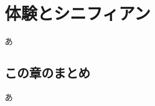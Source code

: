 \section{体験とシニフィアン}\label{ux7b2cux56dbux7ae0ux4f53ux9a13ux3068ux30b7ux30cbux30d5ux30a3ux30a2ux30f3}

あ

\subsection{この章のまとめ}\label{ux3053ux306eux7ae0ux306eux307eux3068ux3081}

あ
